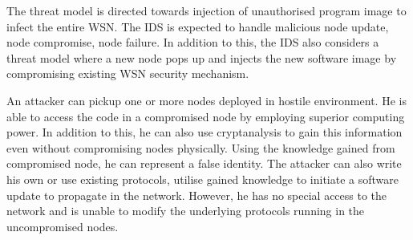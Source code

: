 \documentclass[conference,final]{IEEEtran}
\newcommand{\notedme}[1]{\raisebox{0pt}[0pt][0pt]{\pdfcomment[open=true,color=blue]{#1}}}
\begin{document}
The threat model is directed towards injection of unauthorised program image to infect the entire WSN.
The IDS is expected to handle malicious node update, node compromise, node failure.
In addition to this, the IDS also considers a threat model where a new node pops up and injects the new software image by compromising existing WSN security mechanism.


An  attacker  can pickup one or more nodes deployed in hostile environment. 
He is able to access the code in a compromised node by employing superior computing power. 
In addition to this, he can also use cryptanalysis to gain this information even without compromising nodes physically.
Using the knowledge gained from compromised node, he can represent a false identity.
The attacker can also write his own or use existing protocols, utilise gained knowledge to initiate a software update to propagate in the network.
However, he has  no special  access to  the  network and is unable to modify the underlying protocols running in the uncompromised nodes.



\end{document}
